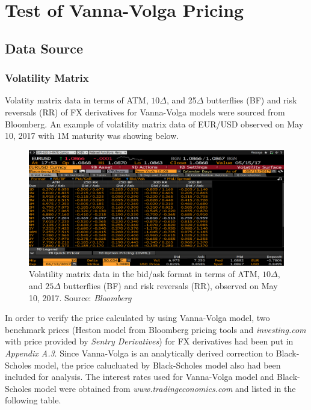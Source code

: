 \chapter{Test of Vanna-Volga Pricing}


\section{Data Source}
\subsection{Volatility Matrix}
Volatity matrix data in terms of ATM, $10\Delta$, and 25$\Delta$ butterflies (BF) and risk reversals (RR) of FX derivatives for Vanna-Volga models were sourced from Bloomberg. An example of volatility matrix data of EUR/USD observed on May 10, 2017 with 1M maturity was showing below.

\begin{figure}[htb]
	\centering
	\includegraphics[scale=0.3]{./Testing-data/VolMatrix/EURUSD_1M_vol.png} 
	\caption{Volatility matrix data in the bid/ask format in terms of ATM, $10\Delta$, and $25\Delta$ butterflies (BF) and risk reversals (RR), observed on May 10, 2017. Source: \textit{Bloomberg}}
	\label{fig:label} %
\end{figure}
\noindent
In order to verify the price calculated by using Vanna-Volga model, two benchmark prices (Heston model from Bloomberg pricing tools and \textit{investing.com} with price provided by \textit{Sentry Derivatives}) for FX derivatives had been put in \textit{Appendix A.3}. Since Vanna-Volga is an analytically derived correction to Black-Scholes model, the price calucluated by Black-Scholes model also had been included for analysis.
\newline
\newline
The interest rates used for Vanna-Volga model and Black-Scholes model were obtained from \textit{www.tradingeconomics.com} and listed in the following table.

